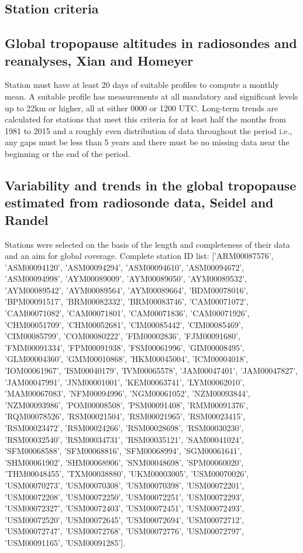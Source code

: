 \documentclass[fleqn,10pt]{wlscirep}
\begin{document}
\subsection{Station criteria}
\subsection*{Global tropopause altitudes in radiosondes and reanalyses, Xian and Homeyer\cite{xian2019global}}
Station must have at least 20 days of suitable profiles to compute a monthly mean. A suitable profile has measurements at all mandatory and significant levels up to 22km or higher, all at either 0000 or 1200 UTC. Long-term trends are calculated for stations that meet this criteria for at least half the months from 1981 to 2015 and a roughly even distribution of data throughout the period i.e., any gaps must be less than 5 years and there must be no missing data near the beginning or the end of the period. 
\subsection*{Variability and trends in the global tropopause estimated from radiosonde data, Seidel and Randel\cite{seidel2006variability}}
Stations were selected on the basis of the length and completeness of their data and an aim for global coverage. Complete station ID list: ['ARM00087576', 'ASM00094120', 'ASM00094294', 'ASM00094610', 'ASM00094672', 'ASM00094998', 'AYM00089009', 'AYM00089050', 'AYM00089532', 'AYM00089542', 'AYM00089564', 'AYM00089664', 'BDM00078016', 'BPM00091517', 'BRM00082332', 'BRM00083746', 'CAM00071072', 'CAM00071082', 'CAM00071801', 'CAM00071836', 'CAM00071926', 'CHM00051709', 'CHM00052681', 'CIM00085442', 'CIM00085469', 'CIM00085799', 'COM00080222', 'FIM00002836', 'FJM00091680', 'FMM00091334', 'FPM00091938', 'FSM00061996', 'GIM00008495', 'GLM00004360', 'GMM00010868', 'HKM00045004', 'ICM00004018', 'IOM00061967', 'ISM00040179', 'IVM00065578', 'JAM00047401', 'JAM00047827', 'JAM00047991', 'JNM00001001', 'KEM00063741', 'LYM00062010', 'MAM00067083', 'NFM00094996', 'NGM00061052', 'NZM00093844', 'NZM00093986', 'POM00008508', 'PSM00091408', 'RMM00091376', 'RQM00078526', 'RSM00021504', 'RSM00021965', 'RSM00023415', 'RSM00023472', 'RSM00024266', 'RSM00028698', 'RSM00030230', 'RSM00032540', 'RSM00034731', 'RSM00035121', 'SAM00041024', 'SFM00068588', 'SFM00068816', 'SFM00068994', 'SGM00061641', 'SHM00061902', 'SHM00068906', 'SNM00048698', 'SPM00060020', 'THM00048455', 'TXM00038880', 'UKM00003005', 'USM00070026', 'USM00070273', 'USM00070308', 'USM00070398', 'USM00072201', 'USM00072208', 'USM00072250', 'USM00072251', 'USM00072293', 'USM00072327', 'USM00072403', 'USM00072451', 'USM00072493', 'USM00072520', 'USM00072645', 'USM00072694', 'USM00072712', 'USM00072747', 'USM00072768', 'USM00072776', 'USM00072797', 'USM00091165', 'USM00091285']. 
\end{document}
